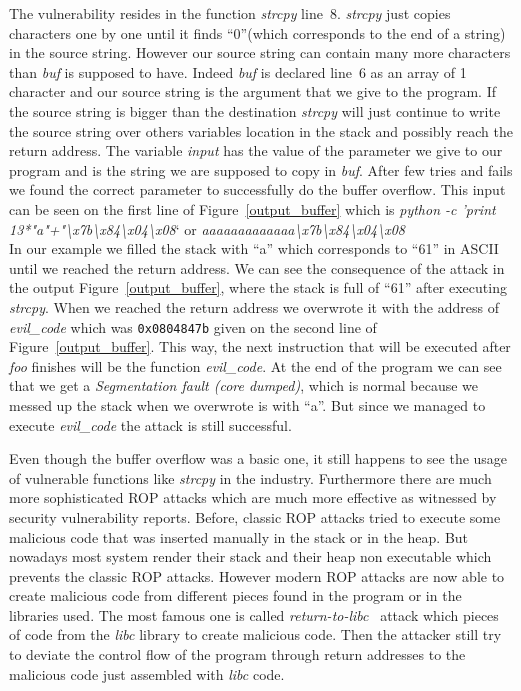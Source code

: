 \documentclass[11pt]{sdm}
\begin{document}
The vulnerability resides in the function \textit{strcpy} line~8. \textit{strcpy} just copies characters one by one until it finds ``0''(which corresponds to the end of a string) in the source string. However our source string can contain many more characters than \textit{buf} is supposed to have. 
Indeed \textit{buf} is declared line~6 as an array of 1 character and our source string is the argument that we give to the program.
If the source string is bigger than the destination \textit{strcpy} will just continue to write the source string over others variables location in the stack and possibly reach the return address.
The variable \textit{input} has the value of the parameter we give to our program and is the string we are supposed to copy in \textit{buf}.
After few tries and fails we found the correct parameter to successfully do the buffer overflow. This input can be seen on the first line of Figure~\ref{output_buffer} which is \textit{python -c 'print 13*"a"+"\textbackslash{x7b}\textbackslash{x84}\textbackslash{x04}\textbackslash{x08}}` or \textit{aaaaaaaaaaaaa\textbackslash{x7b}\textbackslash{x84}\textbackslash{x04}\textbackslash{x08}}\\
In our example we filled the stack with ``a'' which corresponds to ``61'' in ASCII until we reached the return address.
We can see the consequence of the attack in the output Figure~\ref{output_buffer}, where the stack is full of ``61'' after executing \textit{strcpy}.
When we reached the return address we overwrote it with the address of \textit{evil\_code} which was \texttt{0x0804847b} given on the second line of Figure~\ref{output_buffer}.
This way, the next instruction that will be executed after \textit{foo} finishes will be the function \textit{evil\_code}.
At the end of the program we can see that we get a \textit{Segmentation fault (core dumped)}, which is normal because we messed up the stack when we overwrote is with ``a''. But since we managed to execute \textit{evil\_code} the attack is still successful. \hfill \break

Even though the buffer overflow was a basic one, it still happens to see the usage of vulnerable functions like \textit{strcpy} in the industry.
Furthermore there are much more sophisticated ROP attacks which are much more effective as witnessed by security vulnerability reports.
Before, classic ROP attacks tried to execute some malicious code that was inserted manually in the stack or in the heap. But nowadays most system render their stack and their heap non executable which prevents the classic ROP attacks.
However modern ROP attacks are now able to create malicious code from different pieces found in the program or in the libraries used. The most famous one is called \textit{return-to-libc}~\cite{BRSS08}\cite{S07} attack which pieces of code from the \textit{libc} library to create malicious code. Then the attacker still try to deviate the control flow of the program through return addresses to the malicious code just assembled with \textit{libc} code.
\end{document}
